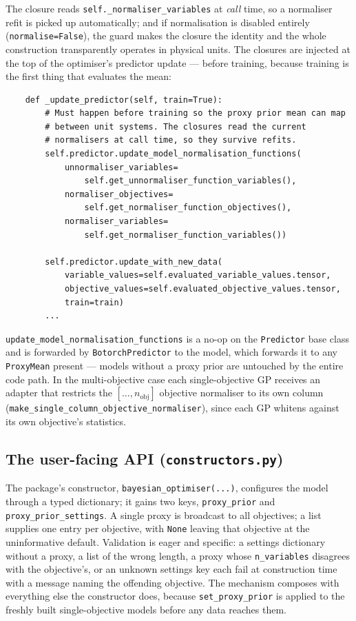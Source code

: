 \documentclass[11pt,a4paper]{article}
\newcommand{\code}[1]{\texttt{#1}}
\begin{document}
The closure reads \code{self.\_normaliser\_variables} at \emph{call} time,
so a normaliser refit is picked up automatically; and if normalisation is
disabled entirely (\code{normalise=False}), the guard makes the closure the
identity and the whole construction transparently operates in physical
units. The closures are injected at the top of the optimiser's
predictor update --- before training, because training is the first thing
that evaluates the mean:

\begin{lstlisting}
    def _update_predictor(self, train=True):
        # Must happen before training so the proxy prior mean can map
        # between unit systems. The closures read the current
        # normalisers at call time, so they survive refits.
        self.predictor.update_model_normalisation_functions(
            unnormaliser_variables=
                self.get_unnormaliser_function_variables(),
            normaliser_objectives=
                self.get_normaliser_function_objectives(),
            normaliser_variables=
                self.get_normaliser_function_variables())

        self.predictor.update_with_new_data(
            variable_values=self.evaluated_variable_values.tensor,
            objective_values=self.evaluated_objective_values.tensor,
            train=train)
        ...
\end{lstlisting}

\code{update\_model\_normalisation\_functions} is a no-op on the
\code{Predictor} base class and is forwarded by \code{BotorchPredictor} to
the model, which forwards it to any \code{ProxyMean} present --- models
without a proxy prior are untouched by the entire code path. In the
multi-objective case each single-objective GP receives an adapter that
restricts the $[\ldots, n_{\mathrm{obj}}]$ objective normaliser to its own
column (\code{make\_single\_column\_objective\_normaliser}), since each GP
whitens against its own objective's statistics.

\subsection{The user-facing API (\code{constructors.py})}
\label{sec:api}

The package's constructor, \code{bayesian\_optimiser(...)}, configures the
model through a typed dictionary; it gains two keys, \code{proxy\_prior} and
\code{proxy\_prior\_settings}. A single proxy is broadcast to all
objectives; a list supplies one entry per objective, with \code{None}
leaving that objective at the uninformative default. Validation is eager and
specific: a settings dictionary without a proxy, a list of the wrong length,
a proxy whose \code{n\_variables} disagrees with the objective's, or an
unknown settings key each fail at construction time with a message naming
the offending objective. The mechanism composes with everything else the
constructor does, because \code{set\_proxy\_prior} is applied to the
freshly built single-objective models before any data reaches them.
\end{document}
